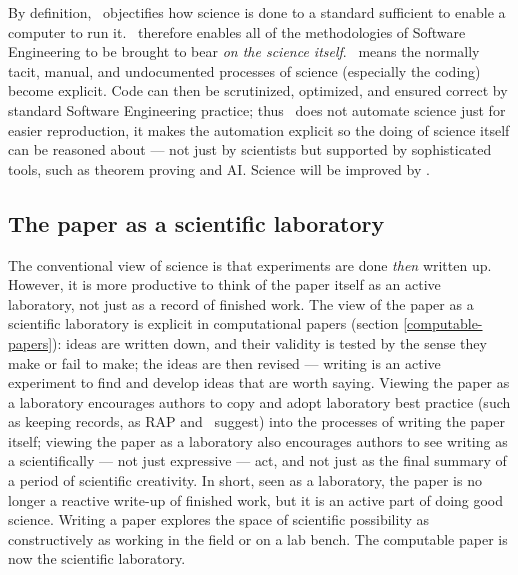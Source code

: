 \documentclass{comjnl}
\begin{document}
By definition, \RAPstar\ objectifies how science is done to a standard sufficient to enable a computer to run it. \RAPstar\ therefore enables all of the methodologies of Software Engineering to be brought to bear \emph{on the science itself}. \RAPstar\ means the normally tacit, manual, and undocumented processes of science (especially the coding) become explicit. Code can then be scrutinized, optimized, and ensured correct by standard Software Engineering practice; thus \RAPstar\ does not automate science just for easier reproduction, it makes the automation explicit so the doing of science itself can be reasoned about --- not just by scientists but supported by sophisticated tools, such as theorem proving and AI\@. Science will be improved by \RAPstar.

\subsection{The paper as a scientific laboratory}\label{paper-as-lab}
The conventional view of science is that experiments are done \emph{then\/} written up. 
However, it is more productive to think of the paper itself as an active laboratory, not just as a record of finished work. The view of the paper as a scientific laboratory is explicit in computational papers (section \ref{computable-papers}): ideas are written down, and their validity is tested by the sense they make or fail to make; the ideas are then revised --- writing is an active experiment to find and develop ideas that are worth saying. Viewing the paper as a laboratory encourages authors to copy and adopt laboratory best practice (such as keeping records, as RAP and \RAPstar\ suggest) into the processes of writing the paper itself; viewing the paper as a laboratory also encourages authors to see writing as a scientifically --- not just expressive --- act, and not just as the final summary of a period of scientific creativity. In short, seen as a laboratory, the paper is no longer a reactive write-up of finished work, but it is an active part of doing good science. Writing a paper explores the space of scientific possibility as constructively as working in the field or on a lab bench. The computable paper is now the scientific laboratory.
\end{document}
